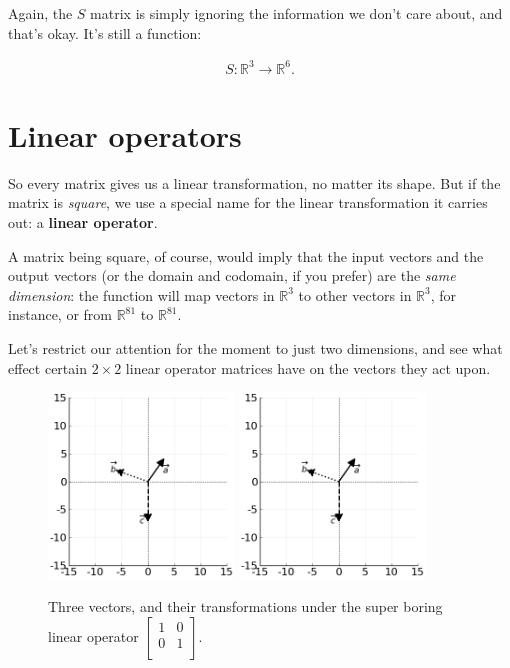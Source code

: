 Again, the $S$ matrix is simply ignoring the information we don't care about,
and that's okay. It's still a function:

\vspace{-.15in}
\begin{align*}
S : \mathbb{R}^3 \rightarrow \mathbb{R}^6.
\end{align*}
\vspace{-.15in}


\section{Linear operators}

\label{linearOps}

So every matrix gives us a linear transformation, no matter its shape. But if
the matrix is \textit{square}, we use a special name for the linear
transformation it carries out: a \textbf{linear operator}.

A matrix being square, of course, would imply that the input vectors and the
output vectors (or the domain and codomain, if you prefer) are the \textit{same
dimension}: the function will map vectors in $\mathbb{R}^3$ to other vectors in
$\mathbb{R}^3$, for instance, or from $\mathbb{R}^{81}$ to $\mathbb{R}^{81}$.

Let's restrict our attention for the moment to just two dimensions, and see
what effect certain $2\times 2$ linear operator matrices have on the vectors
they act upon.

\begin{figure}[hb]
\centering
\includegraphics[width=0.44\textwidth]{preoperators.png}
\includegraphics[width=0.44\textwidth]{preoperators.png}
\caption[.]{Three vectors, and their transformations under the super boring
linear operator {\scriptsize $\begin{bmatrix} 1 & 0 \\ 0 & 1 \\
\end{bmatrix}$.}}
\label{fig:identityOp}
\end{figure}

